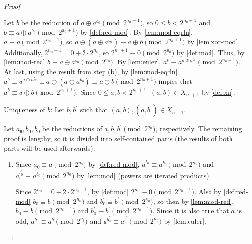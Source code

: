 \documentclass[1gpt]{article}
\theoremstyle{break}
\newcommand{\xor}{\oplus}
\begin{document}
\begin{proof}
\begin{enumerate}
\begin{enumerate}
                    Let $b$ be the reduction of $a \xor a^{b_0}
                    \pmod{2^{n_0+1}}$, so $0 \leq b < 2^{n_0+1}$ and $b \equiv
                    a \xor a^{b_0} \pmod{2^{n_0+1}}$ by \ref{def:red-mod}. By
                    \ref{lem:mod-eqrln}, $a \equiv a \pmod{2^{n_0+1}}$, so $a
                    \xor (a \xor a^{b_0}) \equiv a \xor b \pmod{2^{n_0+1}}$ by
                    \ref{lem:xor-mod}. Additionally, $2^{n_0+1} = 0 + 2 \cdot
                    2^{n_0}$, so $2^{n_0+1} \equiv 0 \pmod{2^{n_0}}$ by
                    \ref{def:mod}. Thus, by \ref{lem:mod-red} $b \equiv a \xor
                    a^{b_0} \pmod{2^{n_0}}$. By \ref{lem:euler}, $a^b \equiv
                    a^{a \xor a^{b_0}} \pmod{2^{n_0+1}}$. At last, using the
                    result from step (b), by \ref{lem:mod-eqrln} $a^b \equiv
                    a^{a \xor a^{b_0}} \equiv a \xor (a \xor a^{b_0}) \equiv a
                    \xor b \pmod{2^{n_0+1}}$ impies  that $a^b \equiv a \xor b
                    \pmod{2^{n_0+1}}$. Since $0 \leq a, b < 2^{n_0+1}$, $(a, b)
                    \in X_{n_0+1}$ by \ref{def:xn}.

            \end{enumerate}

            Uniqueness of $b$: Let $b, b^\prime$ such that $(a, b), (a,
            b^\prime) \in X_{n+1}$.

            Let $a_0, b_0, b^\prime_0$ be the reductions of $a, b, b^\prime
            \pmod{2^{n_0}}$, respectively. The remaining proof is lengthy, so
            it is divided into self-contained parts (the results of both parts
            will be used afterwards):

            \begin{enumerate}

                \item

                    Since $a_0 \equiv a \pmod{2^{n_0}}$ by \ref{def:red-mod},
                    $a_0^{b_0} \equiv a^{b_0} \pmod{2^{n_0}}$ and
                    $a_0^{b^\prime_0} \equiv a^{b^\prime_0} \pmod{2^{n_0}}$ by
                    \ref{lem:mod} (powers are iterated products). 

                    Since $2^{n_0} = 0 + 2 \cdot{2^{n_0 - 1}}$, by
                    \ref{def:mod} $2^{n_0} \equiv 0 \pmod{2^{n_0 - 1}}$. Also
                    by \ref{def:red-mod} $b_0 \equiv b \pmod{2^{n_0}}$ and
                    $b^\prime_0 \equiv b^\prime \pmod{2^{n_0}}$, so then by
                    \ref{lem:mod-red}, $b_0 \equiv b \pmod{2^{n_0-1}}$ and
                    $b^\prime_0 \equiv b^\prime \pmod{2^{n_0-1}}$. Since it is
                    also true that $a$ is odd, $a^{b_0} \equiv a^b
                    \pmod{2^{n_0}}$ and $a^{b^\prime_0} \equiv a^{b^\prime}
                    \pmod{2^{n_0}}$ by \ref{lem:euler}.


\end{enumerate}
\end{enumerate}
\end{proof}
\end{document}
